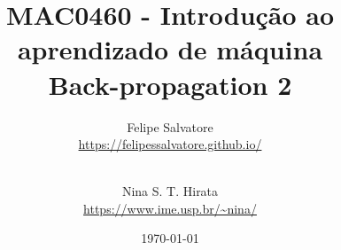 \title{MAC0460 - Introdução ao aprendizado de máquina \\ \vspace{0.2 cm} Back-propagation 2} 
\date{\today}

\author{
  Felipe Salvatore\\
  \url{https://felipessalvatore.github.io/}\vspace{0.4 cm}
  \and\\ 
  Nina S. T. Hirata\\
  \url{https://www.ime.usp.br/~nina/}
  \vspace{0.4 cm}
}



